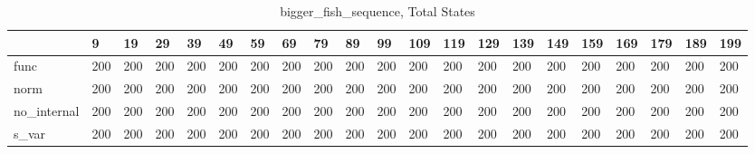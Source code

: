 \begin{table}
\caption{bigger_fish_sequence, Total States}
\label{bigger_fish_sequence_total}
\begin{tabular}{lllllllllllllllllllll}
\toprule
 & 9 & 19 & 29 & 39 & 49 & 59 & 69 & 79 & 89 & 99 & 109 & 119 & 129 & 139 & 149 & 159 & 169 & 179 & 189 & 199 \\
\midrule
func & 200 & 200 & 200 & 200 & 200 & 200 & 200 & 200 & 200 & 200 & 200 & 200 & 200 & 200 & 200 & 200 & 200 & 200 & 200 & 200 \\
norm & 200 & 200 & 200 & 200 & 200 & 200 & 200 & 200 & 200 & 200 & 200 & 200 & 200 & 200 & 200 & 200 & 200 & 200 & 200 & 200 \\
no_internal & 200 & 200 & 200 & 200 & 200 & 200 & 200 & 200 & 200 & 200 & 200 & 200 & 200 & 200 & 200 & 200 & 200 & 200 & 200 & 200 \\
s_var & 200 & 200 & 200 & 200 & 200 & 200 & 200 & 200 & 200 & 200 & 200 & 200 & 200 & 200 & 200 & 200 & 200 & 200 & 200 & 200 \\
\bottomrule
\end{tabular}
\end{table}
